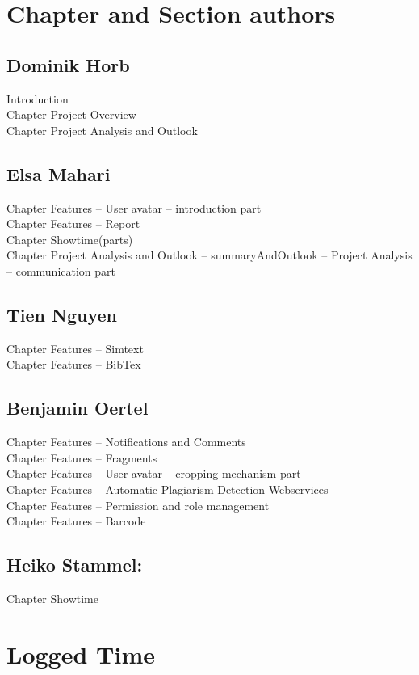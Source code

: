 \begin{appendix}

\chapter{Chapter and Section authors}

\section{Dominik Horb}
Introduction \\
Chapter Project Overview \\
Chapter Project Analysis and Outlook

\section{Elsa Mahari}
Chapter Features -- User avatar – introduction part\\
Chapter Features -- Report\\
Chapter Showtime(parts)\\
Chapter Project Analysis and Outlook -- summaryAndOutlook -- Project Analysis -- communication part

\section{Tien Nguyen}
Chapter Features -- Simtext\\
Chapter Features -- BibTex

\section{Benjamin Oertel}
Chapter Features -- Notifications and Comments\\
Chapter Features -- Fragments\\
Chapter Features -- User avatar – cropping mechanism part \\
Chapter Features -- Automatic Plagiarism Detection Webservices \\
Chapter Features -- Permission and role management \\
Chapter Features -- Barcode

\section{Heiko Stammel:}
Chapter Showtime \\


\chapter{Logged Time}


\end{appendix}
